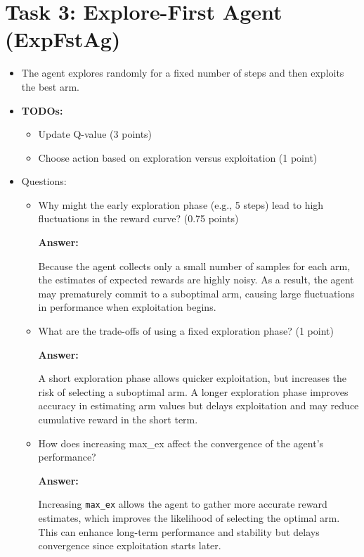 \documentclass[12pt]{article}
\begin{document}
{{{\section{Task 3: Explore-First Agent (ExpFstAg)}
\begin{itemize}[noitemsep]
    \item The agent explores randomly for a fixed number of steps and then exploits the best arm.
    \item \textbf{TODOs:}
    \begin{itemize}[noitemsep]
        \item Update Q-value (3 points)
        \item Choose action based on exploration versus exploitation (1 point)
    \end{itemize}
    \item Questions:
    \begin{itemize}[noitemsep]
        \item Why might the early exploration phase (e.g., 5 steps) lead to high fluctuations in the reward curve?  (0.75 points)

        \textbf{Answer:}

        Because the agent collects only a small number of samples for each arm, the estimates of expected rewards are highly noisy. As a result, the agent may prematurely commit to a suboptimal arm, causing large fluctuations in performance when exploitation begins.

        \item What are the trade-offs of using a fixed exploration phase? (1 point)

        \textbf{Answer:}

        A short exploration phase allows quicker exploitation, but increases the risk of selecting a suboptimal arm. A longer exploration phase improves accuracy in estimating arm values but delays exploitation and may reduce cumulative reward in the short term.

        \item How does increasing max\_ex affect the convergence of the agent’s performance?

        \textbf{Answer:}
        
        Increasing \texttt{max\_ex} allows the agent to gather more accurate reward estimates, which improves the likelihood of selecting the optimal arm. This can enhance long-term performance and stability but delays convergence since exploitation starts later.


\end{itemize}
\end{itemize}}}}
\end{document}

